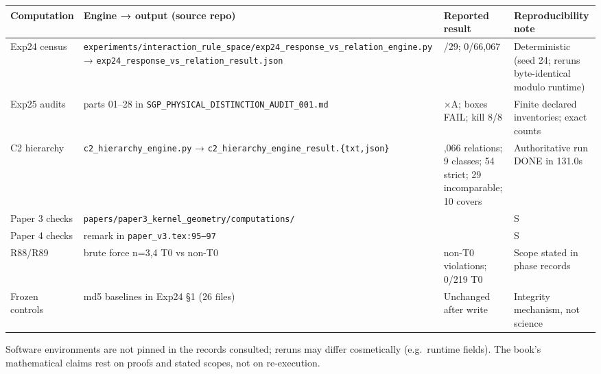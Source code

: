 \documentclass[
  11pt,
]{book}
\begin{document}
\begin{longtable}[]{@{}
  >{\raggedright\arraybackslash}p{}
  >{\raggedright\arraybackslash}p{}
  >{\raggedright\arraybackslash}p{}
  >{\raggedright\arraybackslash}p{}@{}}
\toprule\noalign{}
\begin{minipage}[b]{\linewidth}\raggedright
Computation
\end{minipage} & \begin{minipage}[b]{\linewidth}\raggedright
Engine → output (source repo)
\end{minipage} & \begin{minipage}[b]{\linewidth}\raggedright
Reported result
\end{minipage} & \begin{minipage}[b]{\linewidth}\raggedright
Reproducibility note
\end{minipage} \\
\midrule\noalign{}
\endhead
\bottomrule\noalign{}
\endlastfoot
Exp24 census &
\texttt{experiments/interaction\_rule\_space/exp24\_response\_vs\_relation\_engine.py}
→ \texttt{exp24\_response\_vs\_relation\_result.json} & 29/29; 0/66,067
& Deterministic (seed 24; reruns byte-identical modulo runtime) \\
Exp25 audits & parts 01--28 in
\texttt{SGP\_PHYSICAL\_DISTINCTION\_AUDIT\_001.md} & 7×A; boxes FAIL;
kill 8/8 & Finite declared inventories; exact counts \\
C2 hierarchy & \texttt{c2\_hierarchy\_engine.py} →
\texttt{c2\_hierarchy\_engine\_result.\{txt,json\}} & 66,066 relations;
9 classes; 54 strict; 29 incomparable; 10 covers & Authoritative run
DONE in 131.0s \\
Paper 3 checks & \texttt{papers/paper3\_kernel\_geometry/computations/}
& & S \\
Paper 4 checks & remark in \texttt{paper\_v3.tex:95–97} & & S \\
R88/R89 & brute force n=3,4 T0 vs non-T0 & 10 non-T0 violations; 0/219
T0 & Scope stated in phase records \\
Frozen controls & md5 baselines in Exp24 §1 (26 files) & Unchanged after
write & Integrity mechanism, not science \\
\end{longtable}

Software environments are not pinned in the records consulted; reruns
may differ cosmetically (e.g.~runtime fields). The book's mathematical
claims rest on proofs and stated scopes, not on re-execution.
\end{document}
